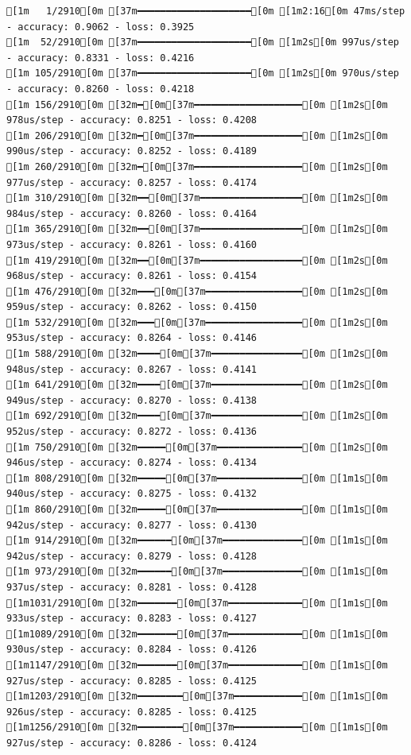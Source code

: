 \documentclass[
  letterpaper,
  DIV=11,
  numbers=noendperiod]{scrartcl}
\begin{document}
\begin{verbatim}
[1m   1/2910[0m [37m━━━━━━━━━━━━━━━━━━━━[0m [1m2:16[0m 47ms/step - accuracy: 0.9062 - loss: 0.3925
[1m  52/2910[0m [37m━━━━━━━━━━━━━━━━━━━━[0m [1m2s[0m 997us/step - accuracy: 0.8331 - loss: 0.4216 
[1m 105/2910[0m [37m━━━━━━━━━━━━━━━━━━━━[0m [1m2s[0m 970us/step - accuracy: 0.8260 - loss: 0.4218
[1m 156/2910[0m [32m━[0m[37m━━━━━━━━━━━━━━━━━━━[0m [1m2s[0m 978us/step - accuracy: 0.8251 - loss: 0.4208
[1m 206/2910[0m [32m━[0m[37m━━━━━━━━━━━━━━━━━━━[0m [1m2s[0m 990us/step - accuracy: 0.8252 - loss: 0.4189
[1m 260/2910[0m [32m━[0m[37m━━━━━━━━━━━━━━━━━━━[0m [1m2s[0m 977us/step - accuracy: 0.8257 - loss: 0.4174
[1m 310/2910[0m [32m━━[0m[37m━━━━━━━━━━━━━━━━━━[0m [1m2s[0m 984us/step - accuracy: 0.8260 - loss: 0.4164
[1m 365/2910[0m [32m━━[0m[37m━━━━━━━━━━━━━━━━━━[0m [1m2s[0m 973us/step - accuracy: 0.8261 - loss: 0.4160
[1m 419/2910[0m [32m━━[0m[37m━━━━━━━━━━━━━━━━━━[0m [1m2s[0m 968us/step - accuracy: 0.8261 - loss: 0.4154
[1m 476/2910[0m [32m━━━[0m[37m━━━━━━━━━━━━━━━━━[0m [1m2s[0m 959us/step - accuracy: 0.8262 - loss: 0.4150
[1m 532/2910[0m [32m━━━[0m[37m━━━━━━━━━━━━━━━━━[0m [1m2s[0m 953us/step - accuracy: 0.8264 - loss: 0.4146
[1m 588/2910[0m [32m━━━━[0m[37m━━━━━━━━━━━━━━━━[0m [1m2s[0m 948us/step - accuracy: 0.8267 - loss: 0.4141
[1m 641/2910[0m [32m━━━━[0m[37m━━━━━━━━━━━━━━━━[0m [1m2s[0m 949us/step - accuracy: 0.8270 - loss: 0.4138
[1m 692/2910[0m [32m━━━━[0m[37m━━━━━━━━━━━━━━━━[0m [1m2s[0m 952us/step - accuracy: 0.8272 - loss: 0.4136
[1m 750/2910[0m [32m━━━━━[0m[37m━━━━━━━━━━━━━━━[0m [1m2s[0m 946us/step - accuracy: 0.8274 - loss: 0.4134
[1m 808/2910[0m [32m━━━━━[0m[37m━━━━━━━━━━━━━━━[0m [1m1s[0m 940us/step - accuracy: 0.8275 - loss: 0.4132
[1m 860/2910[0m [32m━━━━━[0m[37m━━━━━━━━━━━━━━━[0m [1m1s[0m 942us/step - accuracy: 0.8277 - loss: 0.4130
[1m 914/2910[0m [32m━━━━━━[0m[37m━━━━━━━━━━━━━━[0m [1m1s[0m 942us/step - accuracy: 0.8279 - loss: 0.4128
[1m 973/2910[0m [32m━━━━━━[0m[37m━━━━━━━━━━━━━━[0m [1m1s[0m 937us/step - accuracy: 0.8281 - loss: 0.4128
[1m1031/2910[0m [32m━━━━━━━[0m[37m━━━━━━━━━━━━━[0m [1m1s[0m 933us/step - accuracy: 0.8283 - loss: 0.4127
[1m1089/2910[0m [32m━━━━━━━[0m[37m━━━━━━━━━━━━━[0m [1m1s[0m 930us/step - accuracy: 0.8284 - loss: 0.4126
[1m1147/2910[0m [32m━━━━━━━[0m[37m━━━━━━━━━━━━━[0m [1m1s[0m 927us/step - accuracy: 0.8285 - loss: 0.4125
[1m1203/2910[0m [32m━━━━━━━━[0m[37m━━━━━━━━━━━━[0m [1m1s[0m 926us/step - accuracy: 0.8285 - loss: 0.4125
[1m1256/2910[0m [32m━━━━━━━━[0m[37m━━━━━━━━━━━━[0m [1m1s[0m 927us/step - accuracy: 0.8286 - loss: 0.4124

\end{verbatim}
\end{document}
